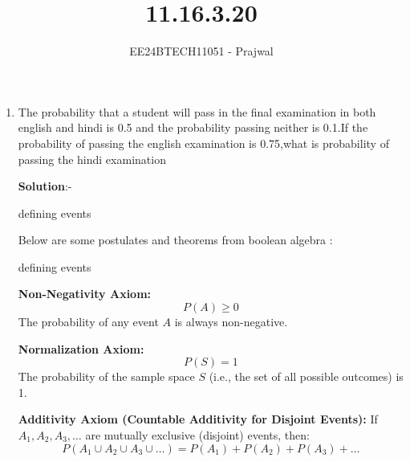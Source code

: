 \documentclass[journal]{IEEEtran}
\numberwithin{equation}{enumi}
\numberwithin{figure}{enumi}
\begin{document}

\title{11.16.3.20}
\author{EE24BTECH11051 - Prajwal}
{\let\newpage\relax\maketitle}
\begin{enumerate} 

\item The probability that a student will pass in the final examination in both english and hindi is 0.5 and the probability passing neither is 0.1.If the probability of  passing the english examination is 0.75,what is probability of passing the hindi examination

\textbf{Solution}:-\\
  \begin{table}[h!]    
  \centering
  
  \caption{defining events}
  \label{table}
\end{table}
\newline Below are some postulates and theorems from boolean algebra : 
  \begin{table}[h!]    
  \centering
  
  \caption{defining events}
  \label{table}
\end{table}
\newline\textbf{Non-Negativity Axiom:}
\[
P(A) \geq 0
\]
The probability of any event \( A \) is always non-negative.

\textbf{Normalization Axiom:}
\[
P(S) = 1
\]
The probability of the sample space \( S \) (i.e., the set of all possible outcomes) is 1.

\textbf{Additivity Axiom (Countable Additivity for Disjoint Events):}  
If \( A_1, A_2, A_3, \dots \) are mutually exclusive (disjoint) events, then:
\[
P(A_1 \cup A_2 \cup A_3 \cup \dots) = P(A_1) + P(A_2) + P(A_3) + \dots
\]


\end{enumerate}
\end{document}
